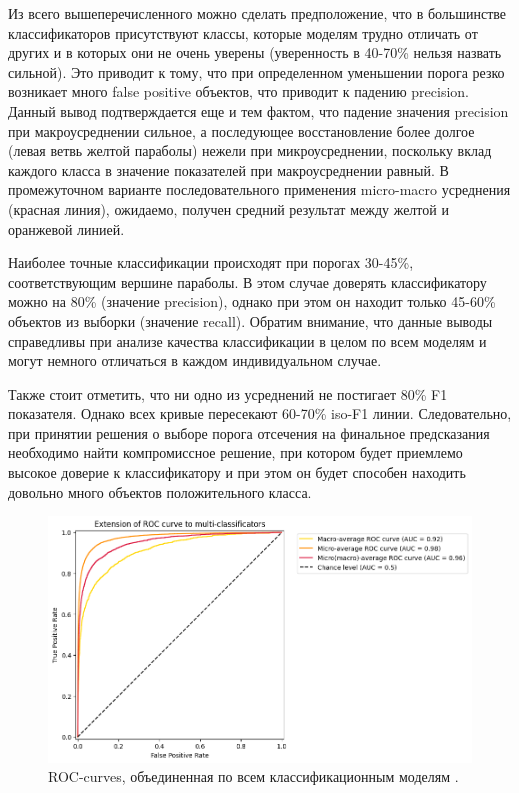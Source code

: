 \documentclass[a4paper,12pt]{extarticle}
\begin{document}
Из всего вышеперечисленного можно сделать предположение, что в большинстве классификаторов присутствуют классы, которые моделям трудно отличать от других и в которых они не очень уверены (уверенность в 40-70\% нельзя назвать сильной). Это приводит к тому, что при определенном уменьшении порога резко возникает много false positive объектов, что приводит к падению precision. Данный вывод подтверждается еще и тем фактом, что падение значения precision при макроусреднении сильное, а последующее восстановление более долгое (левая ветвь желтой параболы) нежели при микроусреднении, поскольку вклад каждого класса в значение показателей при макроусреднении равный. В промежуточном варианте последовательного применения micro-macro усреднения (красная линия), ожидаемо, получен средний результат между желтой и оранжевой линией. 

Наиболее точные классификации происходят при порогах 30-45\%, соответствующим вершине параболы. В этом случае доверять классификатору можно на 80\% (значение precision), однако при этом он находит только 45-60\% объектов из выборки (значение recall). Обратим внимание, что данные выводы справедливы при анализе качества классификации в целом по всем моделям и могут немного отличаться в каждом индивидуальном случае.

Также стоит отметить, что ни одно из усреднений не постигает 80\% F1 показателя. Однако всех кривые пересекают 60-70\% iso-F1 линии. Следовательно, при принятии решения о выборе порога отсечения на финальное предсказания необходимо найти компромиссное решение, при котором будет приемлемо высокое доверие к классификатору и при этом он будет способен находить довольно много объектов положительного класса. 

\begin{figure}[ht]
	\centering
	\includegraphics[scale=0.7]{roc_curves/roccurve_general.png}
	\caption{ROC-curves, объединенная по всем классификационным моделям .}
	\label{fig:roccurve_general}
\end{figure}
\end{document}

